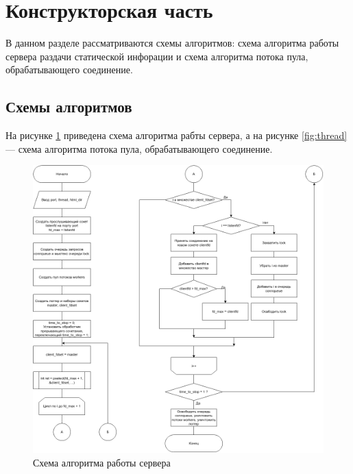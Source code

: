 \section{\large Конструкторская часть}

В  данном  разделе  рассматриваются схемы алгоритмов: схема алгоритма работы сервера раздачи статической инфорации и схема алгоритма потока пула, обрабатывающего соединение.

\subsection{Схемы алгоритмов}

На рисунке \ref{fig:server} приведена схема алгоритма рабты сервера, а на рисунке \ref{fig:thread} --- схема алгоритма потока пула, обрабатывающего соединение.

\clearpage

\begin{figure}[h!]
	\centering
	\captionsetup{justification=centering}
	\includegraphics[width=170mm]{img/server.png}
	\caption{Схема алгоритма работы сервера}
	\label{fig:server}
\end{figure}

